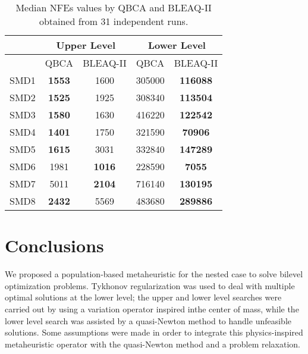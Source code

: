 \documentclass[conference]{IEEEtran}
\theoremstyle{definition}
\begin{document}
\begin{table}[!ht]
    \caption{Median NFEs values by QBCA and BLEAQ-II obtained from 31 independent runs.}
    \label{tab:ul-comparative-fes}
    \centering
    \begin{tabular}{|c|c|c||c|c|}
\hline
& \multicolumn{2}{c||}{Upper Level} & \multicolumn{2}{c|}{Lower Level} \\ \hline
& QBCA & BLEAQ-II & QBCA & BLEAQ-II \\ \hline
SMD1 & \textbf{1553}  & 1600          &  305000 & \textbf{116088} \\ \hline
SMD2 & \textbf{1525}  & 1925          &  308340 & \textbf{113504} \\ \hline
SMD3 & \textbf{1580}  & 1630          &  416220 & \textbf{122542} \\ \hline
SMD4 & \textbf{1401} & 1750  &  321590 & \textbf{70906} \\ \hline
SMD5 & \textbf{1615}  & 3031          &  332840 & \textbf{147289} \\ \hline
SMD6 & 1981 &  \textbf{1016} &   228590& \textbf{7055} \\ \hline
SMD7 & 5011 &  \textbf{2104} & 716140  & \textbf{130195} \\ \hline
SMD8 & \textbf{2432}  & 5569          &  483680 & \textbf{289886} \\ \hline
    \end{tabular}
\end{table}





\section{Conclusions} %
\label{sec:conclusions}


We proposed a population-based metaheuristic for the nested case to solve bilevel
optimization problems. Tykhonov regularization was used to deal with multiple
optimal solutions at the lower level; the upper and lower level searches were
carried out by using a variation operator inspired inthe center of mass, while
the lower level search was assisted by a quasi-Newton method to handle unfeasible
solutions. Some assumptions were made in order to integrate this physics-inspired
metaheuristic operator with the quasi-Newton method and a problem relaxation.
\end{document}
